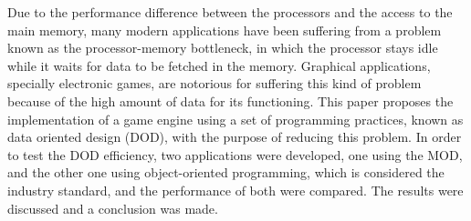 Due to the performance difference between the processors and the access to the main 
memory, many modern applications have been suffering from a problem known as 
the processor-memory bottleneck, in which the processor stays idle while it waits for 
data to be fetched in the memory. Graphical applications, specially electronic games, are 
notorious for suffering this kind of problem because of the high amount of data 
for its functioning. This paper proposes the implementation of a game engine
using a set of programming practices, known as data oriented design (DOD), with the 
purpose of reducing this problem. In order to test the DOD efficiency, two applications 
were developed, one using the MOD, and the other one using object-oriented programming, 
which is considered the industry standard, and the performance of both were compared. 
The results were discussed and a conclusion was made.
